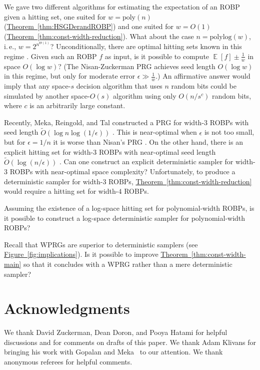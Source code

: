 \documentclass[11pt]{article}
\numberwithin{equation}{section}
\theoremstyle{definition}
\theoremstyle{plain}
\newcommand{\ie}{i.\,e.}
\newcommand{\expref}[2]{\hyperref[#2]{#1~\ref{#2}}}
\DeclareMathOperator*{\ExpVal}{\mathbb{E}}
\begin{document}
We gave two different algorithms for estimating the expectation of an ROBP given a hitting set, one suited for $w = \text{poly}(n)$ (\expref{Theorem}{thm:HSGDerandROBP}) and one suited for $w = O(1)$ (\expref{Theorem}{thm:const-width-reduction}). What about the case $n = \text{polylog}(w)$, \ie, $w = 2^{n^{\Theta(1)}}$? Unconditionally, there are optimal hitting sets known in this regime \cite{AKS87, HZ20}. Given such an ROBP $f$ as input, is it possible to compute $\ExpVal[f] \pm \frac{1}{w}$ in space $O(\log w)$? (The Nisan-Zuckerman PRG \cite{NZ96} achieves seed length $O(\log w)$ in this regime, but only for moderate error $\epsilon \gg \frac{1}{w}$.) An affirmative answer would imply that any space-$s$ decision algorithm that uses $n$ random bits could be simulated by another space-$O(s)$ algorithm using only $O(n / s^c)$ random bits, where $c$ is an arbitrarily large constant.

Recently, Meka, Reingold, and Tal constructed a PRG for width-$3$ ROBPs with seed length \linebreak $\widetilde{O}(\log n \log(1/\epsilon))$ \cite{MRT19}. This is near-optimal when $\epsilon$ is not too small, but for $\epsilon = 1/n$ it is worse than Nisan's PRG \cite{Nis92}. On the other hand, there is an explicit hitting set for width-$3$ ROBPs with near-optimal seed length $\widetilde{O}(\log(n/\epsilon))$ \cite{GMRTV12}. Can one construct an explicit deterministic sampler for width-$3$ ROBPs with near-optimal space complexity? Unfortunately, to produce a deterministic sampler for width-$3$ ROBPs, \expref{Theorem}{thm:const-width-reduction} would require a hitting set for width-$4$ ROBPs.

Assuming the existence of a log-space hitting set for polynomial-width ROBPs, is it possible to construct a log-space deterministic sampler for polynomial-width ROBPs?

Recall that WPRGs are superior to deterministic samplers (see \expref{Figure}{fig:implications}). Is it possible to improve \expref{Theorem}{thm:const-width-main} so that it concludes with a WPRG rather than a mere deterministic sampler?

\section{Acknowledgments}

We thank David Zuckerman, Dean Doron, and Pooya Hatami for helpful discussions and for comments on drafts of this paper. We thank Adam Klivans for bringing his work with Gopalan and Meka~\cite{GKM12} to our attention. We thank anonymous referees for helpful comments.
\end{document}
